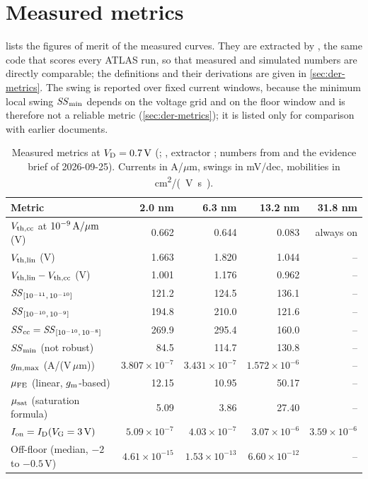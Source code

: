 \section{Measured metrics}\label{sec:inp-metrics-measured}

 lists the figures of merit of the measured curves. They are extracted by
\protect{}, the same code that scores every ATLAS run, so that measured and simulated
numbers are directly comparable; the definitions and their derivations are given in \cref{sec:der-metrics}. The swing is
reported over fixed current windows, because the minimum local swing $\mathit{SS}_{\min}$ depends on the voltage grid and on the
floor window and is therefore not a reliable metric (\cref{sec:der-metrics}); it is listed only for comparison with
earlier documents.

\begin{table}[htbp]
\centering
\small
\caption{Measured metrics at $V_{\mathrm{D}} = \SI{0.7}{V}$ (\evDATA; \protect{}, extractor
\protect{}; numbers from \protect{} and the evidence brief of 2026-09-25).
Currents in A/$\mu$m, swings in mV/dec, mobilities in \si{cm^2/(V.s)}.}
\label{tab:measured-metrics}
\begin{tabular}{@{}lrrrr@{}}
\toprule
Metric & 2.0 nm & 6.3 nm & 13.2 nm & 31.8 nm \\
\midrule
$V_{\mathrm{th,cc}}$ at $10^{-9}\,\mathrm{A}/\mu\mathrm{m}$ (V) & 0.662 & 0.644 & 0.083 & always on \\
$V_{\mathrm{th,lin}}$ (V) & 1.663 & 1.820 & 1.044 & -- \\
$V_{\mathrm{th,lin}} - V_{\mathrm{th,cc}}$ (V) & 1.001 & 1.176 & 0.962 & -- \\
$\mathit{SS}_{[10^{-11},\,10^{-10}]}$ & 121.2 & 124.5 & 136.1 & -- \\
$\mathit{SS}_{[10^{-10},\,10^{-9}]}$ & 194.8 & 210.0 & 121.6 & -- \\
$\mathit{SS}_{\mathrm{cc}} = \mathit{SS}_{[10^{-10},\,10^{-8}]}$ & 269.9 & 295.4 & 160.0 & -- \\
$\mathit{SS}_{\min}$ (not robust) & 84.5 & 114.7 & 130.8 & -- \\
$g_{\mathrm{m,max}}$ (A/(V\,$\mu$m)) & $3.807\times10^{-7}$ & $3.431\times10^{-7}$ & $1.572\times10^{-6}$ & -- \\
$\mu_{\mathrm{FE}}$ (linear, $g_{\mathrm{m}}$-based) & 12.15 & 10.95 & 50.17 & -- \\
$\mu_{\mathrm{sat}}$ (saturation formula) & 5.09 & 3.86 & 27.40 & -- \\
$I_{\mathrm{on}} = I_{\mathrm{D}}(V_{\mathrm{G}} = \SI{3}{V})$ & $5.09\times10^{-7}$ & $4.03\times10^{-7}$ & $3.07\times10^{-6}$ & $3.59\times10^{-6}$ \\
Off-floor (median, $-2$ to $-0.5$\,V) & $4.61\times10^{-15}$ & $1.53\times10^{-13}$ & $6.60\times10^{-12}$ & -- \\
\bottomrule
\end{tabular}
\end{table}


